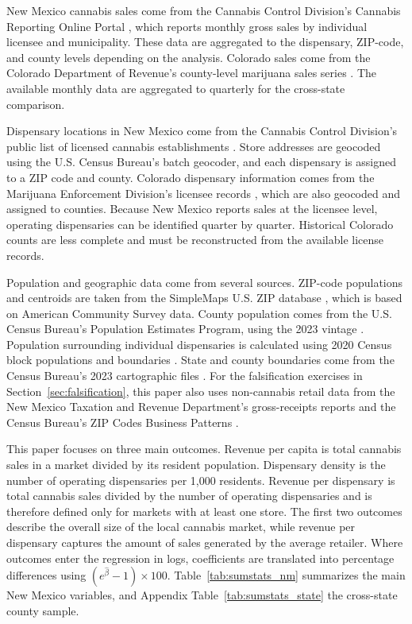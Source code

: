 \documentclass[12pt]{article}
\begin{document}
New Mexico cannabis sales come from the Cannabis Control Division's Cannabis Reporting Online Portal \citep{NMCCDReporting}, which reports monthly gross sales by individual licensee and municipality. These data are aggregated to the dispensary, ZIP-code, and county levels depending on the analysis. Colorado sales come from the Colorado Department of Revenue's county-level marijuana sales series \citep{COMarijuanaSalesByCounty}. The available monthly data are aggregated to quarterly for the cross-state comparison.

Dispensary locations in New Mexico come from the Cannabis Control Division's public list of licensed cannabis establishments \citep{NMCCDLicensees}. Store addresses are geocoded using the U.S. Census Bureau's batch geocoder, and each dispensary is assigned to a ZIP code and county. Colorado dispensary information comes from the Marijuana Enforcement Division's licensee records \citep{COMedLicensees}, which are also geocoded and assigned to counties. Because New Mexico reports sales at the licensee level, operating dispensaries can be identified quarter by quarter. Historical Colorado counts are less complete and must be reconstructed from the available license records.

Population and geographic data come from several sources. ZIP-code populations and centroids are taken from the SimpleMaps U.S. ZIP database \citep{SimpleMapsZIP}, which is based on American Community Survey data. County population comes from the U.S. Census Bureau's Population Estimates Program, using the 2023 vintage \citep{CensusPopEst2023}. Population surrounding individual dispensaries is calculated using 2020 Census block populations and boundaries \citep{CensusBlocks2020}. State and county boundaries come from the Census Bureau's 2023 cartographic files \citep{CensusCountyShapefile}. For the falsification exercises in Section~\ref{sec:falsification}, this paper also uses non-cannabis retail data from the New Mexico Taxation and Revenue Department's gross-receipts reports \citep{NMTRDGrossReceipts} and the Census Bureau's ZIP Codes Business Patterns \citep{CensusZBP}.

This paper focuses on three main outcomes. Revenue per capita is total cannabis sales in a market divided by its resident population. Dispensary density is the number of operating dispensaries per 1,000 residents. Revenue per dispensary is total cannabis sales divided by the number of operating dispensaries and is therefore defined only for markets with at least one store. The first two outcomes describe the overall size of the local cannabis market, while revenue per dispensary captures the amount of sales generated by the average retailer. Where outcomes enter the regression in logs, coefficients are translated into percentage differences using $(e^{\hat\beta}-1)\times100$. Table~\ref{tab:sumstats_nm} summarizes the main New Mexico variables, and Appendix Table~\ref{tab:sumstats_state} the cross-state county sample. 
\end{document}
